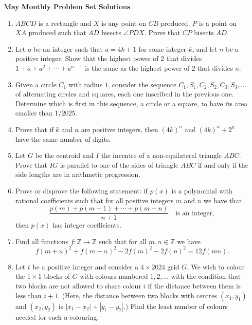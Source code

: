 \documentclass[11pt]{article}
\begin{document}
\begin{center} \bfseries \large
    May Monthly Problem Set Solutions

\end{center}


\begin{enumerate}[topsep=\bigskipamount,itemsep=\bigskipamount,leftmargin=0pt]
\item $ABCD$ is a rectangle and $X$ is any point on $CB$ produced.
$P$ is a point on $XA$ produced such that $AD$ bisects $\angle PDX$.
Prove that $CP$ bisects $AD$.

\item Let $a$ be an integer such that $a = 4k+1$ for some integer $k$, and let $n$ be a positive integer.
Show that the highest power of $2$ that divides $1 +a +a^2 +\dotsb + a^{n-1}$ is the same as the highest power of $2$ that divides $n$.

\item Given a circle $C_1$ with radius $1$, consider the sequence $C_1, S_1, C_2, S_2, C_3, S_3, \dotsc$ of alternating circles and squares, each one inscribed in the previous one.
Determine which is first in this sequence, a circle or a square, to have its area smaller than $1/2025$.

\item Prove that if $k$ and $n$ are positive integers, then $(4k)^n$ and $(4k)^n+2^n$ have the same number of digits.

\item 
Let $G$ be the centroid and $I$ the incentre of a non-equilateral triangle $ABC$.
Prove that $IG$ is parallel to one of the sides of triangle $ABC$ if and only if the side lengths are in arithmetic progression.

\item Prove or disprove the following statement: if $p(x)$ is a polynomial with rational coefficients such that for all positive integers $m$ and $n$ we have that
\[ \frac{p(m) +p(m+1) +\dotsb +p(m+n)}{n+1} \quad\text{is an integer}, \]
then $p(x)$ has integer coefficients.

\item Find all functions $f : \mathbb{Z} \to \mathbb{Z}$ such that for all $m,n \in \mathbb{Z}$ we have
\[ f(m+n)^2 +f(m-n)^2 -2f(m)^2-2f(n)^2 = 12f(mn). \]

\item 
Let $t$ be a positive integer and consider a $4\times 2024$ grid $G$.
We wish to colour the $1\times 1$ blocks of $G$ with colours numbered $1,2,\dotsc$ with the condition that two blocks are not allowed to share colour $i$ if the distance between them is less than $i+1$.
(Here, the distance between two blocks with centres $(x_1,y_1)$ and $(x_2,y_2)$ is $|x_1-x_2|+|y_1-y_2|$.)
Find the least number of colours needed for such a colouring.
\end{enumerate}
\end{document}
